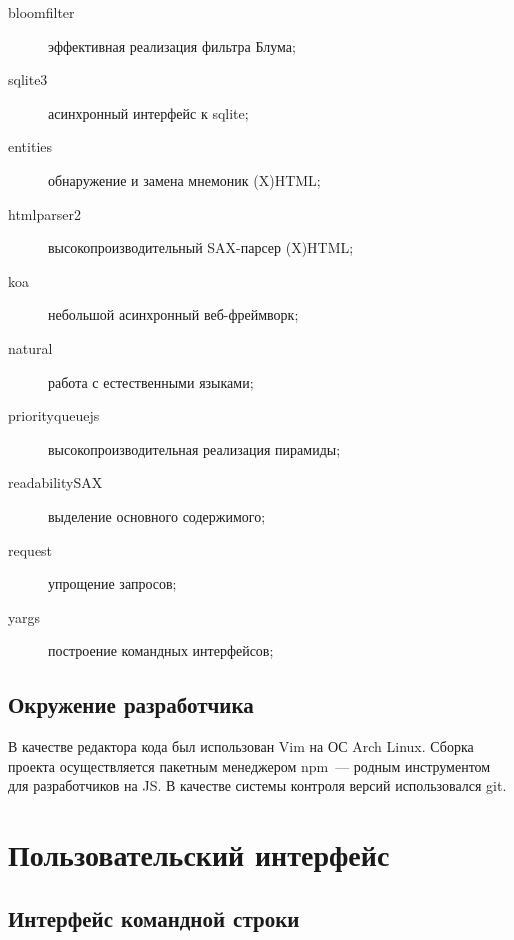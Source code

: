 \begin{description}
  \item[bloomfilter] эффективная реализация фильтра Блума;
  \item[sqlite3] асинхронный интерфейс к sqlite;
  \item[entities] обнаружение и замена мнемоник (X)HTML;
  \item[htmlparser2] высокопроизводительный SAX-парсер (X)HTML;
  \item[koa] небольшой асинхронный веб-фреймворк;
  \item[natural] работа с естественными языками;
  \item[priorityqueuejs] высокопроизводительная реализация пирамиды;
  \item[readabilitySAX] выделение основного содержимого;
  \item[request] упрощение запросов;
  \item[yargs] построение командных интерфейсов;
\end{description}


\subsection*{Окружение разработчика}
В качестве редактора кода был использован Vim на ОС Arch Linux. Сборка проекта осуществляется пакетным менеджером npm~--- родным инструментом для разработчиков на JS. В качестве системы контроля версий использовался git.


\section{Пользовательский интерфейс}
\subsection*{Интерфейс командной строки}
